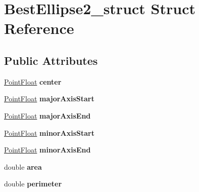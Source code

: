 \hypertarget{structBestEllipse2__struct}{\section{\-Best\-Ellipse2\-\_\-struct \-Struct \-Reference}
\label{structBestEllipse2__struct}
}
\subsection*{\-Public \-Attributes}
\begin{DoxyCompactItemize}
\item 
\hypertarget{structBestEllipse2__struct_aac1296e212a811c2022cbed6faffb49a}{\hyperlink{structPointFloat__struct}{\-Point\-Float} {\bfseries center}}\label{structBestEllipse2__struct_aac1296e212a811c2022cbed6faffb49a}

\item 
\hypertarget{structBestEllipse2__struct_aef5939f303d9aa6e9335bb5561218a80}{\hyperlink{structPointFloat__struct}{\-Point\-Float} {\bfseries major\-Axis\-Start}}\label{structBestEllipse2__struct_aef5939f303d9aa6e9335bb5561218a80}

\item 
\hypertarget{structBestEllipse2__struct_a21a1aa1211dcf81b03b03b8142ff2fa2}{\hyperlink{structPointFloat__struct}{\-Point\-Float} {\bfseries major\-Axis\-End}}\label{structBestEllipse2__struct_a21a1aa1211dcf81b03b03b8142ff2fa2}

\item 
\hypertarget{structBestEllipse2__struct_a78c182a61ce53bae39b2d50097cf6a34}{\hyperlink{structPointFloat__struct}{\-Point\-Float} {\bfseries minor\-Axis\-Start}}\label{structBestEllipse2__struct_a78c182a61ce53bae39b2d50097cf6a34}

\item 
\hypertarget{structBestEllipse2__struct_a9b5cdb5d3c22822b85cf931f8f4476ec}{\hyperlink{structPointFloat__struct}{\-Point\-Float} {\bfseries minor\-Axis\-End}}\label{structBestEllipse2__struct_a9b5cdb5d3c22822b85cf931f8f4476ec}

\item 
\hypertarget{structBestEllipse2__struct_acee2b7d3b4a464f437c661ceeb73d743}{double {\bfseries area}}\label{structBestEllipse2__struct_acee2b7d3b4a464f437c661ceeb73d743}

\item 
\hypertarget{structBestEllipse2__struct_ab38294de38b0c911f4c700de7c9cc300}{double {\bfseries perimeter}}\label{structBestEllipse2__struct_ab38294de38b0c911f4c700de7c9cc300}


\end{DoxyCompactItemize}

